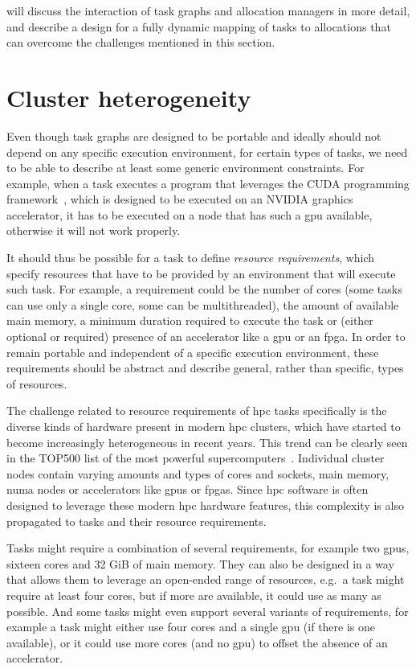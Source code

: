  will discuss the interaction of task graphs and allocation managers in
more detail, and describe a design for a fully dynamic mapping of tasks to allocations that can
overcome the challenges mentioned in this section.

\section{Cluster heterogeneity}
Even though task graphs are designed to be portable and ideally should not depend on any specific
execution environment, for certain types of tasks, we need to be able to describe at least some
generic environment constraints. For example, when a task executes a program that leverages the
CUDA programming framework~\cite{cuda}, which is designed to be executed on an
NVIDIA graphics accelerator, it has to be executed on a node that has such a
\gls{gpu} available, otherwise it will not work properly.

It should thus be possible for a task to define \emph{resource requirements}, which specify
resources that have to be provided by an environment that will execute such task. For example, a
requirement could be the number of cores (some tasks can use only a single core, some can be
multithreaded), the amount of available main memory, a minimum duration required to execute the
task or (either optional or required) presence of an accelerator like a \gls{gpu}
or an \gls{fpga}. In order to remain portable and independent of a specific
execution environment, these requirements should be abstract and describe general, rather than
specific, types of resources.

The challenge related to resource requirements of \gls{hpc} tasks specifically is
the diverse kinds of hardware present in modern \gls{hpc} clusters, which have
started to become increasingly heterogeneous in recent years. This trend can be clearly seen in the
TOP500 list of the most powerful supercomputers~\cite{top500analysis}. Individual cluster
nodes contain varying amounts and types of cores and sockets, main memory,
\gls{numa} nodes or accelerators like \glspl{gpu} or
\glspl{fpga}. Since \gls{hpc} software is often designed to
leverage these modern \gls{hpc} hardware features, this complexity is also
propagated to tasks and their resource requirements.

Tasks might require a combination of several requirements, for example two
\glspl{gpu}, sixteen cores and 32 GiB of main memory. They can also be designed in
a way that allows them to leverage an open-ended range of resources, e.g.\ a task might require at
least four cores, but if more are available, it could use as many as possible. And some tasks might
even support several variants of requirements, for example a task might either use four cores and a
single \gls{gpu} (if there is one available), or it could use more cores (and no \gls{gpu})
to offset the absence of an accelerator.

